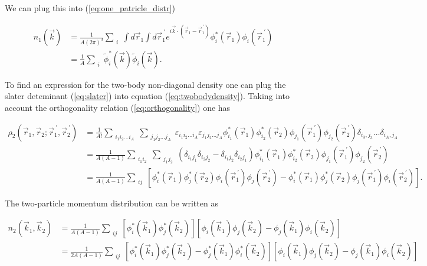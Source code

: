 \documentclass[12pt]{article}
\begin{document}
We can plug this into (\ref{eq:one_patricle_distr})

\begin{align} 
	n_1(\vec{k})&=\frac{1}{A(2\pi)^3} \sum_{\substack{i}} \int d\vec{r}_1 \int d\vec{r}_1^{\ \prime} e^{i\vec{k}\cdot (\vec{r}_1-\vec{r}^{\ \prime}_1)}
	\phi^*_i(\vec{r}_1)\phi_i(\vec{r}_1^{\ \prime}) \\
	& = \frac{1}{A} \sum_{\substack{i}} \tilde{\phi}^*_i(\vec{k})\tilde{\phi}_i(\vec{k}).
\end{align}

To find an expression for the two-body non-diagonal density one can plug the slater deteminant (\ref{eq:slater}) into equation (\ref{eq:twobodydensity}). Taking into account the orthogonality relation (\ref{eq:orthogonality}) one has

\begin{align}
\rho_2(\vec{r}_1,\vec{r}_2;\vec{r}^{\ \prime}_1,\vec{r}^{\ \prime}_2) 
&  = \frac{1}{A!} 	 \sum_{\substack{i_1 i_2 \ldots i_A}} \sum_{\substack{j_1j_2 \ldots j_A}} \varepsilon_{i_1 i_2 \ldots i_A} \varepsilon_{j_1j_2 \ldots j_A} \phi^*_{i_1}(\vec{r}_1)\phi^*_{i_2}(\vec{r}_2) \phi_{j_1}(\vec{r}_1^{\ \prime})\phi_{j_2}(\vec{r}_2^{\ \prime})
\delta_{i_3,j_3}...\delta_{i_A,j_A} \\
&  = \frac{1}{A(A-1)} 	 \sum_{\substack{i_1 i_2}} \sum_{\substack{j_1j_2}} \left(\delta_{i_1j_1}\delta_{i_2j_2} - \delta_{i_1j_2}\delta_{i_2j_1} \right)
\phi^*_{i_1}(\vec{r}_1)\phi^*_{i_2}(\vec{r}_2) \phi_{j_1}(\vec{r}_1^{\ \prime})\phi_{j_2}(\vec{r}_2^{\ \prime}) \\
& = \frac{1}{A(A-1)}\sum_{\substack{i j}} \left[\phi^*_{i}(\vec{r}_1)\phi^*_{j}(\vec{r}_2) \phi_{i}(\vec{r}_1^{\ \prime})\phi_{j}(\vec{r}_2^{\ \prime})  - \phi^*_{i}(\vec{r}_1)\phi^*_{j}(\vec{r}_2) \phi_{j}(\vec{r}_1^{\ \prime})\phi_{i}(\vec{r}_2^{\ \prime}) \right].
\end{align}

The two-particle momentum distribution can be written as

\begin{align} \label{two-body}
n_2(\vec{k}_1,\vec{k}_2) & = \frac{1}{A(A-1)}\sum_{\substack{i j}} \left[\phi^*_{i}(\vec{k}_1)\phi^*_{j}(\vec{k}_2) \right] \left[ \phi_{i}(\vec{k}_1)\phi_{j}(\vec{k}_2)  - \phi_{j}(\vec{k}_1)\phi_{i}(\vec{k}_2) \right]  \\
& = \frac{1}{2A(A-1)}\sum_{\substack{i j}} \left[\phi^*_{i}(\vec{k}_1)\phi^*_{j}(\vec{k}_2)- \phi^*_{j}(\vec{k}_1)\phi^*_{i}(\vec{k}_2) \right] \left[ \phi_{i}(\vec{k}_1)\phi_{j}(\vec{k}_2)  - \phi_{j}(\vec{k}_1)\phi_{i}(\vec{k}_2) \right] 
\end{align}
\end{document}
